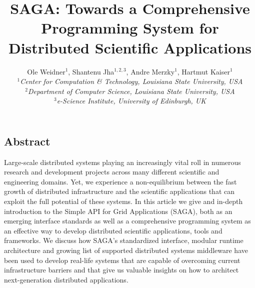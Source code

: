 \documentclass[a4paper,10pt]{article}
\newcommand{\jhanote}[1]{  {\textcolor{red}     { ***Shantenu: #1 }}}
\newcommand{\jhanote}[1]{}
\begin{document}
 \title{ \large \vspace{-3.5em} SAGA: Towards a Comprehensive Programming System for Distributed Scientific Applications }
 
 \author{\normalsize Ole Weidner$^{1}$, Shantenu Jha$^{1,2,3}$, Andre Merzky$^{1}$, Hartmut Kaiser$^{1}$ \\
   \small{\emph{$^{1}$Center for Computation \& Technology, Louisiana State University, USA}}\\
   \small{\emph{$^{2}$Department of Computer Science, Louisiana State University, USA}}\\
   \small{\emph{$^{3}$e-Science Institute, University of Edinburgh, UK}}
 }
 \date{}
 \maketitle
 




\subsection*{Abstract}

Large-scale distributed systems playing an increasingly vital roll in numerous research and development
projects across many different scientific and engineering domains. Yet, we experience a non-equilibrium between the fast
growth of distributed infrastructure and the scientific applications that can exploit the full
potential of these systems. 
In this article we give and in-depth introduction to the Simple API for Grid Applications (SAGA), both
as an emerging interface standards as well as a comprehensive programming system as an effective way to
develop distributed scientific applications, tools and frameworks. We discuss how SAGA's standardized
interface, modular runtime architecture and growing list of supported distributed systems middleware
have been used to develop real-life systems that are capable of overcoming current infrastructure 
barriers and that give us valuable insights on how to architect next-generation distributed applications.
\end{document}
